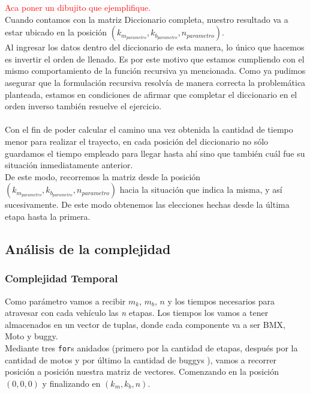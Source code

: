 \textcolor{red}{Aca poner un dibujito que ejemplifique.}\\

Cuando contamos con la matriz Diccionario completa, nuestro resultado va a estar ubicado en la posici\'on $(k_{m_{parametro}},k_{b_{parametro}},n_{parametro})$.\\

Al ingresar los datos dentro del diccionario de esta manera, lo \'unico que hacemos es invertir el orden de llenado. Es por este motivo que estamos cumpliendo con el mismo comportamiento de la funci\'on recursiva ya mencionada. Como ya pudimos asegurar que la formulaci\'on recursiva resolv\'ia de manera correcta la problem\'atica planteada, estamos en condiciones de afirmar que completar el diccionario en el orden inverso tambi\'en resuelve el ejercicio.\\
\\


Con el fin de poder calcular el camino una vez obtenida la cantidad de tiempo menor para realizar el trayecto, en cada posici\'on del diccionario no s\'olo guardamos el tiempo empleado para llegar hasta ah\'i sino que tambi\'en cu\'al fue su situaci\'on inmediatamente anterior.\\

De este modo, recorremos la matriz  desde la posici\'on $(k_{m_{parametro}},k_{b_{parametro}},n_{parametro})$ hacia la situaci\'on que indica la misma, y as\'i sucesivamente. De este modo obtenemos las elecciones hechas desde la \'ultima etapa hasta la primera.



\newpage
\subsection{An\'alisis de la complejidad}
\subsubsection{Complejidad Temporal}

Como par\'ametro vamos a recibir $m_k$, $m_b$, $n$ y los tiempos necesarios para atravesar con cada veh\'iculo las \emph{n} etapas. Los tiempos los vamos a tener almacenados en un vector de tuplas, donde cada componente va a ser BMX, Moto y buggy.\\

Mediante tres \texttt{for}s anidados (primero por la cantidad de etapas, despu\'es por la cantidad de motos y por \'ultimo la cantidad de buggys ), vamos a recorrer posici\'on a posici\'on nuestra matriz de vectores. Comenzando en la posici\'on $(0,0,0)$ y finalizando en  $(k_{m},k_{b},n)$.

